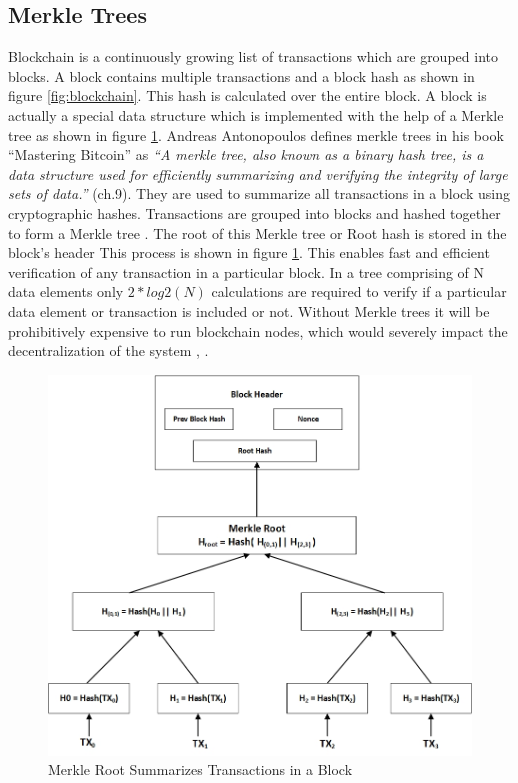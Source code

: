 \subsection{Merkle Trees} \label{MerkleTrees}
Blockchain is a continuously growing list of transactions which are grouped into blocks. A block contains multiple transactions and a block hash as shown in figure \ref{fig:blockchain}. This hash is calculated over the entire block. A block is actually a special data structure which is implemented with the help of a Merkle tree as shown in figure \ref{fig:mtree}. Andreas Antonopoulos defines merkle trees in his book “Mastering Bitcoin” as \textit{“A merkle tree, also known as a binary hash tree, is a data structure used for efficiently summarizing and verifying the integrity of large sets of data.”} \cite{andy_mb} (ch.9). They are used to summarize all transactions in a block using cryptographic hashes. Transactions are grouped into blocks and hashed together to form a Merkle tree \cite{paper:001}. The root of this Merkle tree or Root hash is stored in the block's header This process is shown in figure \ref{fig:mtree}. This enables fast and efficient verification of any transaction in a particular block. In a tree comprising of N data elements only \(2*log2 (N)\) calculations are required to verify if a particular data element or transaction is included or not. Without Merkle trees it will be prohibitively expensive to run blockchain nodes, which would severely impact the decentralization of the system \cite{cryptoeprint:2018:274}, \cite{paper:001}. 
\vspace*{1mm}
\begin{figure}[h]
	\centering
    \includegraphics[width=130mm,scale=1]{figs/mtree}
	\caption{Merkle Root Summarizes Transactions in a Block} 
	\label{fig:mtree}
\end{figure}


